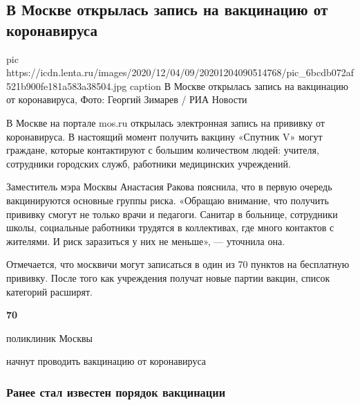  
 
 
 
 
 
\subsection{В Москве открылась запись на вакцинацию от коронавируса}
\label{sec:04_12_2020.news.ru.lenta_ru.1.koronavirus_moskva_vaccine}


\ifcmt
pic https://icdn.lenta.ru/images/2020/12/04/09/20201204090514768/pic_6bcdb072af521b900fe181a583a38504.jpg
caption В Москве открылась запись на вакцинацию от коронавируса, Фото: Георгий Зимарев / РИА Новости
\fi

В Москве на портале mos.ru открылась электронная запись на прививку от
коронавируса. В настоящий момент получить вакцину «Спутник V» могут граждане,
которые контактируют с большим количеством людей: учителя, сотрудники городских
служб, работники медицинских учреждений.

Заместитель мэра Москвы Анастасия Ракова пояснила, что в первую очередь
вакцинируются основные группы риска. «Обращаю внимание, что получить прививку
смогут не только врачи и педагоги. Санитар в больнице, сотрудники школы,
социальные работники трудятся в коллективах, где много контактов с жителями. И
риск заразиться у них не меньше», --- уточнила она.

Отмечается, что москвичи могут записаться в один из 70 пунктов на бесплатную
прививку. После того как учреждения получат новые партии вакцин, список
категорий расширят.

\begin{leftbar}
	\bfseries
{\centering\Huge\color{orange}	70}\par
поликлиник Москвы\par
начнут проводить вакцинацию от коронавируса
\end{leftbar}

\subsubsection{Ранее стал известен порядок вакцинации}

